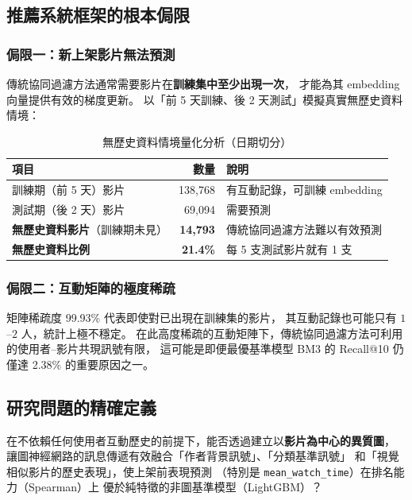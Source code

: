 \documentclass[12pt, a4paper]{article}
\begin{document}
\subsection{推薦系統框架的根本侷限}

\subsubsection{侷限一：新上架影片無法預測}

傳統協同過濾方法通常需要影片在\textbf{訓練集中至少出現一次}，
才能為其 embedding 向量提供有效的梯度更新。
以「前 5 天訓練、後 2 天測試」模擬真實無歷史資料情境：

\begin{table}[H]
\centering
\caption{無歷史資料情境量化分析（日期切分）}
\small
\begin{tabular}{lrl}
\toprule
\textbf{項目} & \textbf{數量} & \textbf{說明} \\
\midrule
訓練期（前 5 天）影片 & 138,768 & 有互動記錄，可訓練 embedding \\
測試期（後 2 天）影片 & 69,094  & 需要預測 \\
\textbf{無歷史資料影片}（訓練期未見）& \textbf{14,793} & 傳統協同過濾方法難以有效預測 \\
\midrule
\textbf{無歷史資料比例} & \textbf{21.4\%} & 每 5 支測試影片就有 1 支 \\
\bottomrule
\end{tabular}
\end{table}

\subsubsection{侷限二：互動矩陣的極度稀疏}

\begin{definebox}[稀疏度的影響]
矩陣稀疏度 99.93\% 代表即使對已出現在訓練集的影片，
其互動記錄也可能只有 $1$--$2$ 人，統計上極不穩定。
在此高度稀疏的互動矩陣下，傳統協同過濾方法可利用的使用者--影片共現訊號有限，
這可能是即便最優基準模型 BM3 的 Recall@10 仍僅達 2.38\% 的重要原因之一。
\end{definebox}

\subsection{研究問題的精確定義}

\begin{keybox}[研究問題]
在不依賴任何使用者互動歷史的前提下，能否透過建立以\textbf{影片為中心的異質圖}，
讓圖神經網路的訊息傳遞有效融合「作者背景訊號」、「分類基準訊號」
和「視覺相似影片的歷史表現」，使上架前表現預測
（特別是 \texttt{mean\_watch\_time}）在排名能力（Spearman）上
優於純特徵的非圖基準模型（LightGBM）？
\end{keybox}
\end{document}
